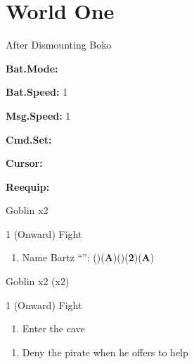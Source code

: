 \chapter{World One}

\vspace{\baselineskip}

\begin{paracol}{2}

\begin{menu}{After Dismounting Boko}
	\varwb
	\begin{configMenu}
		\item {} \textbf{Bat.Mode:} \activeOption
		\item {} \textbf{Bat.Speed:} 1
		\item {} \textbf{Msg.Speed:} 1
		\item {} \textbf{Cmd.Set:} \shortOption
		\item {} \textbf{Cursor:} \memoryOption
		\item {} \textbf{Reequip:} \emptyOption
	\end{configMenu}
	\varwe
\end{menu}

\begin{encounter}{Goblin x2}
	\varwb
	\begin{round}{1 (Onward)}
		\bartz Fight
	\end{round}
	\varwe
\end{encounter}

\begin{enumerate}
	\item Name Bartz  “”: (\pointDown)(\textbf{A})(\pointUp)(\textbf{2}\pointRight)(\textbf{A})
\end{enumerate}

\begin{encounter}{Goblin x2 (x2)}
	\varwb
	\begin{round}{1 (Onward)}
		\bartz Fight
	\end{round}
	\varwe
\end{encounter}

\begin{enumerate}[resume]
	\item Enter the cave
\end{enumerate}

\resume
\begin{enumerate}[resume]
	\item Deny the pirate when he offers to help 
\end{enumerate}

\end{paracol}